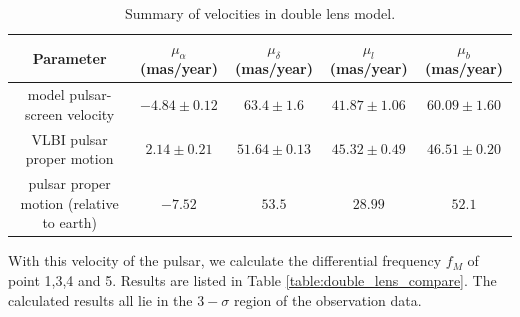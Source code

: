 \documentclass[useAMS,usenatbib]{mn2e}
\begin{document}
\begin{table}
\centering
\begin{tabular}{ccccc}
\hline
Parameter & $\mu_{\alpha}$(mas/year) & $\mu_{\delta}$(mas/year) & $\mu_{l}$(mas/year) & $\mu_b$ (mas/year)\\
\hline
model pulsar-screen velocity & $-4.84\pm 0.12$ & $63.4\pm 1.6$ & $41.87\pm 1.06$ & $60.09\pm 1.60$ \\
VLBI pulsar proper motion & $2.14 \pm 0.21$ & $51.64\pm 0.13$ & $45.32\pm 0.49$ & $46.51 \pm 0.20$\\
pulsar proper motion (relative to earth) & $-7.52$ &  $53.5$ & $28.99$  & $52.1$ \\
\hline
\end{tabular}
\caption{Summary of velocities in double lens model.}
\label{Table:velocity}
\end{table}



With this velocity of the pulsar, we calculate the differential
frequency $f_M$ of point 1,3,4 and 5. Results are listed in Table
\ref{table:double_lens_compare}. The calculated results all lie in the
$3-\sigma$ region of the observation data. 
\end{document}
